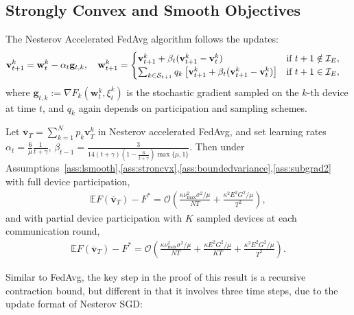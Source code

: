 \subsection{Strongly Convex and Smooth Objectives}
\begin{comment}
We first show that the Nesterov accelerated FedAvg has $\mathcal{O}(1/NT)$
convergence rate for $\mu$-strongly convex and $L$-smooth objectives.
\end{comment}
The Nesterov Accelerated FedAvg algorithm follows the updates:
\begin{align*}
\mathbf{v}_{t+1}^{k} & =\mathbf{w}_{t}^{k}-\alpha_{t}\mathbf{g}_{t,k}, \hspace{1em}
\mathbf{w}_{t+1}^{k} =\begin{cases}
\mathbf{v}_{t+1}^{k}+\beta_{t}(\mathbf{v}_{t+1}^{k}-\mathbf{v}_{t}^{k}) & \text{if }t+1\notin\mathcal{I}_{E},\\
\sum_{k \in {\mathcal{S}}_{t+1}}q_k\left[\mathbf{v}_{t+1}^{k}+\beta_{t}(\mathbf{v}_{t+1}^{k}-\mathbf{v}_{t}^{k})\right] & \text{if }t+1\in\mathcal{I}_{E},
\end{cases}
\end{align*}
where $\mathbf{g}_{t,k}:=\nabla F_{k}(\mathbf{w}_{t}^{k},\xi_{t}^{k})$ is
the stochastic gradient sampled on the $k$-th device at time $t$, and $q_k$ again depends on participation and sampling schemes.  
\begin{theorem}
	\label{thm:nesterov_scvx}Let $\overline{\mathbf{v}}_{T}=\sum_{k=1}^{N}p_{k}\mathbf{v}_{T}^{k}$ in Nesterov accelerated FedAvg,
	and set learning rates $\alpha_{t}=\frac{6}{\mu}\frac{1}{t+\gamma}$,  $\beta_{t-1}=\frac{3}{14(t+\gamma)(1-\frac{6}{t+\gamma})\max\{\mu,1\}}$. Then under Assumptions~\ref{ass:lsmooth},\ref{ass:stroncvx},\ref{ass:boundedvariance},\ref{ass:subgrad2} with full device participation, 
	\begin{align*}
	\mathbb{E}F(\overline{\mathbf{v}}_{T})-F^{\ast}=\mathcal{O}\left(\frac{\kappa\nu_{\max}^{2}\sigma^{2}/\mu}{NT}+\frac{\kappa^{2}E^{2}G^{2}/\mu}{T^{2}}\right),
	\end{align*}
	and with partial device participation with $K$ sampled devices at
	each communication round, 
	\begin{align*}
	\mathbb{E}F(\overline{\mathbf{v}}_{T})-F^{\ast}=\mathcal{O}\left(\frac{\kappa\nu_{\max}^{2}\sigma^{2}/\mu}{NT}+\frac{\kappa E^{2}G^{2}/\mu}{KT}+\frac{\kappa^{2}E^{2}G^{2}/\mu}{T^{2}}\right).
	\end{align*}
\end{theorem}
Similar to FedAvg, the key step in the proof of this result is a recursive contraction bound, but different in that it involves three time steps, due to the update format of Nesterov SGD:
